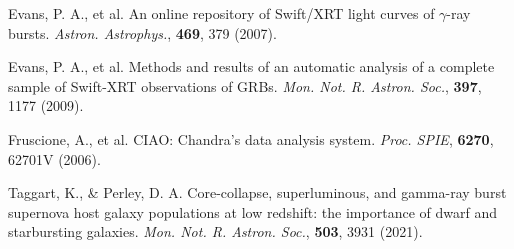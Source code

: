 \documentclass{nature_plusfigure}
\newcommand{\mn}{{Mon. Not. R. Astron. Soc.}}
\newcommand{\mnras}{\mn}
\newcommand{\aap}{{Astron. Astrophys.}}
\newcommand{\procspie}{Proc. SPIE}
\begin{document}
\begin{methods}
\begin{thebibliography}{10}
 Evans, P. A., et al. An online repository of Swift/XRT light curves of $\gamma$-ray bursts. \emph{\aap}, \textbf{469}, 379 (2007). 

 Evans, P. A., et al. Methods and results of an automatic analysis of a complete sample of Swift-XRT observations of GRBs. \emph{\mnras}, \textbf{397}, 1177 (2009). 

 Fruscione, A., et al. CIAO: Chandra's data analysis system. \emph{\procspie}, \textbf{6270}, 62701V (2006). 


 Taggart, K., \& Perley, D. A. Core-collapse, superluminous, and gamma-ray burst supernova host galaxy populations at low redshift: the importance of dwarf and starbursting galaxies. \emph{\mnras}, \textbf{503}, 3931 (2021). 

\end{thebibliography}

\end{methods}

\clearpage
\end{document}
